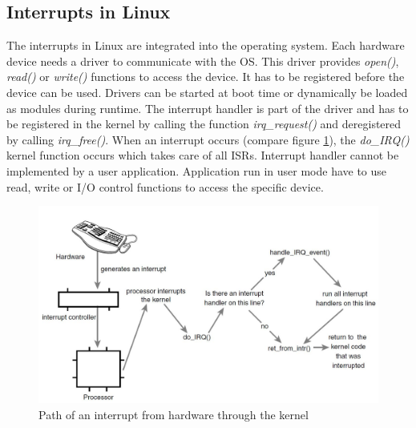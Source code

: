 \subsection{Interrupts in Linux}\label{ss_interrupts_in_linux}
The interrupts in Linux are integrated into the operating system.
Each hardware device needs a driver to communicate with the \ac{OS}.
This driver provides \textit{open()}, \textit{read()} or \textit{write()} functions to access the device. 
It has to be registered before the device can be used.
Drivers can be started at boot time or dynamically be loaded as modules during runtime.
The interrupt handler is part of the driver and has to be registered in the kernel by calling the function \textit{irq\_request()} and deregistered by calling \textit{irq\_free()}.
When an interrupt occurs (compare figure \ref{fig_irq_path_linux}), the \textit{do\_IRQ()} kernel function occurs which takes care of all \acp{ISR}. 
Interrupt handler cannot be implemented by a user application.
Application run in user mode have to use read, write or \ac{I/O} control functions to access the specific device.

\begin{figure}[htb]
	\begin{center}
		\includegraphics[scale=0.3]{inputs/pictures_ch1/irq_path_linux}
	\end{center}
	\caption[Path of an interrupt from hardware through the kernel]{Path of an interrupt from hardware through the kernel \cite{love:lkd}} \label{fig_irq_path_linux}
\end{figure}

